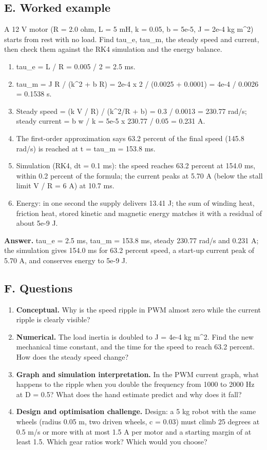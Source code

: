 \documentclass[11pt,a4paper]{article}
\begin{document}
\subsection*{E. Worked example}
A 12 V motor (R = 2.0 ohm, L = 5 mH, k = 0.05, b = 5e-5, J = 2e-4 kg m\textasciicircum{}2) starts from rest with no load. Find tau\_e, tau\_m, the steady speed and current, then check them against the RK4 simulation and the energy balance.
\begin{enumerate}[nosep]
\item tau\_e = L / R = 0.005 / 2 = 2.5 ms.
\item tau\_m = J R / (k\textasciicircum{}2 + b R) = 2e-4 x 2 / (0.0025 + 0.0001) = 4e-4 / 0.0026 = 0.1538 s.
\item Steady speed = (k V / R) / (k\textasciicircum{}2/R + b) = 0.3 / 0.0013 = 230.77 rad/s; steady current = b w / k = 5e-5 x 230.77 / 0.05 = 0.231 A.
\item The first-order approximation says 63.2 percent of the final speed (145.8 rad/s) is reached at t = tau\_m = 153.8 ms.
\item Simulation (RK4, dt = 0.1 ms): the speed reaches 63.2 percent at 154.0 ms, within 0.2 percent of the formula; the current peaks at 5.70 A (below the stall limit V / R = 6 A) at 10.7 ms.
\item Energy: in one second the supply delivers 13.41 J; the sum of winding heat, friction heat, stored kinetic and magnetic energy matches it with a residual of about 5e-9 J.
\end{enumerate}
\textbf{Answer.} tau\_e = 2.5 ms, tau\_m = 153.8 ms, steady 230.77 rad/s and 0.231 A; the simulation gives 154.0 ms for 63.2 percent speed, a start-up current peak of 5.70 A, and conserves energy to 5e-9 J.

\subsection*{F. Questions}
\begin{enumerate}[nosep]
\item \textbf{Conceptual.} Why is the speed ripple in PWM almost zero while the current ripple is clearly visible?
\item \textbf{Numerical.} The load inertia is doubled to J = 4e-4 kg m\textasciicircum{}2. Find the new mechanical time constant, and the time for the speed to reach 63.2 percent. How does the steady speed change?
\item \textbf{Graph and simulation interpretation.} In the PWM current graph, what happens to the ripple when you double the frequency from 1000 to 2000 Hz at D = 0.5? What does the hand estimate predict and why does it fall?
\item \textbf{Design and optimisation challenge.} Design: a 5 kg robot with the same wheels (radius 0.05 m, two driven wheels, c = 0.03) must climb 25 degrees at 0.5 m/s or more with at most 1.5 A per motor and a starting margin of at least 1.5. Which gear ratios work? Which would you choose?
\end{enumerate}
\end{document}

